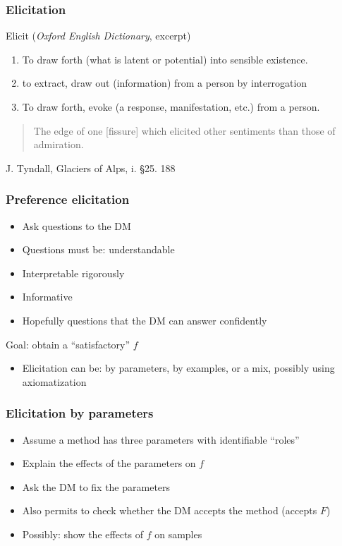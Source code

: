 \documentclass[french,english]{beamer}
\begin{document}
\begin{frame}
	\frametitle{Elicitation}
	\begin{block}{Elicit (\emph{Oxford English Dictionary}{\tiny , excerpt})}
		\begin{enumerate}
			\item To draw forth (what is latent or potential) into sensible existence.
			\item to extract, draw out (information) from a person by interrogation
			\item  To draw forth, evoke (a response, manifestation, etc.) from a person.
		\end{enumerate}
		\begin{quote}
			The edge of one [fissure] which elicited other sentiments than those of admiration.
		\end{quote}\vspace{-2em}\scriptsize
		\begin{flushright}
			J. Tyndall, Glaciers of Alps, i. §25. 188
		\end{flushright}
	\end{block}
	\begin{quote}
	\end{quote}
\end{frame}

\begin{frame}
	\frametitle{Preference elicitation}
	\begin{itemize}
		\item Ask questions to the \ac{DM}
		\item Questions must be: understandable
		\item Interpretable rigorously
		\item Informative
		\item {\tiny Hopefully} questions that the \ac{DM} can answer confidently
	\end{itemize}
	Goal: obtain a “satisfactory” $f$
	\begin{itemize}
		\item Elicitation can be: by parameters, by examples, or a mix, possibly using axiomatization
	\end{itemize}
\end{frame}

\begin{frame}
	\frametitle{Elicitation by parameters}
	\begin{itemize}
		\item Assume a method has three parameters with identifiable “roles”
		\item Explain the effects of the parameters on $f$
		\item Ask the \ac{DM} to fix the parameters
		\item Also permits to check whether the \ac{DM} accepts the method (accepts $F$)
		\item Possibly: show the effects of $f$ on samples
	\end{itemize}
\end{frame}
\end{document}
